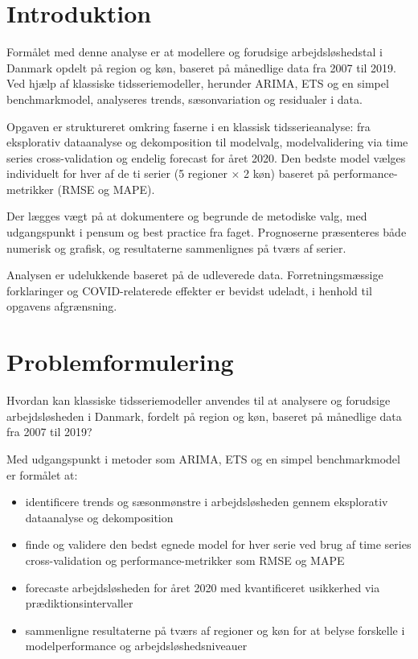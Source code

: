 \documentclass[
]{article}
\providecommand{\tightlist}{%
  \setlength{\itemsep}{0pt}\setlength{\parskip}{0pt}}\usepackage{longtable,booktabs,array}
\begin{document}
\setcounter{page}{1}
\tableofcontents
\newpage

\section{Introduktion}\label{introduktion}

Formålet med denne analyse er at modellere og forudsige
arbejdsløshedstal i Danmark opdelt på region og køn, baseret på
månedlige data fra 2007 til 2019. Ved hjælp af klassiske
tidsseriemodeller, herunder ARIMA, ETS og en simpel benchmarkmodel,
analyseres trends, sæsonvariation og residualer i data.

Opgaven er struktureret omkring faserne i en klassisk tidsserieanalyse:
fra eksplorativ dataanalyse og dekomposition til modelvalg,
modelvalidering via time series cross-validation og endelig forecast for
året 2020. Den bedste model vælges individuelt for hver af de ti serier
(5 regioner × 2 køn) baseret på performance-metrikker (RMSE og MAPE).

Der lægges vægt på at dokumentere og begrunde de metodiske valg, med
udgangspunkt i pensum og best practice fra faget. Prognoserne
præsenteres både numerisk og grafisk, og resultaterne sammenlignes på
tværs af serier.

Analysen er udelukkende baseret på de udleverede data.
Forretningsmæssige forklaringer og COVID-relaterede effekter er bevidst
udeladt, i henhold til opgavens afgrænsning.

\section{Problemformulering}\label{problemformulering}

Hvordan kan klassiske tidsseriemodeller anvendes til at analysere og
forudsige arbejdsløsheden i Danmark, fordelt på region og køn, baseret
på månedlige data fra 2007 til 2019?

Med udgangspunkt i metoder som ARIMA, ETS og en simpel benchmarkmodel er
formålet at:

\begin{itemize}
\tightlist
\item
  identificere trends og sæsonmønstre i arbejdsløsheden gennem
  eksplorativ dataanalyse og dekomposition
\item
  finde og validere den bedst egnede model for hver serie ved brug af
  time series cross-validation og performance-metrikker som RMSE og MAPE
\item
  forecaste arbejdsløsheden for året 2020 med kvantificeret usikkerhed
  via prædiktionsintervaller
\item
  sammenligne resultaterne på tværs af regioner og køn for at belyse
  forskelle i modelperformance og arbejdsløshedsniveauer
\end{itemize}
\end{document}
